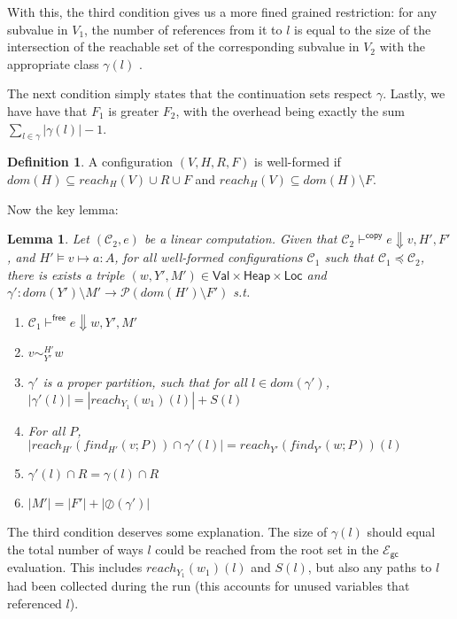 \documentclass{easychair}
\newcommand{\ms}[1]{\ensuremath{\mathsf{#1}}}
\newcommand{\veq}[4]{#3 \sim^{#1}_{#2} #4}
\newcommand{\oh}[1]{\oslash(#1)}
\newcommand{\gcSem}{\ensuremath{\mathcal{E}_{\ms{gc}}}}
\newtheorem{lemma}[theorem]{Lemma}
\theoremstyle{definition}
\newtheorem{definition}{Definition}
\begin{document}
With this, the third condition gives us a more fined grained restriction: for any subvalue in $V_1$,
the number of references from it to $l$ is equal to the size of 
the intersection of the reachable set of the corresponding subvalue in $V_2$
with the appropriate class $\gamma(l)$ .

The next condition simply states that the continuation sets respect $\gamma$. Lastly, 
we have have that $F_1$ is greater $F_2$, with the overhead being exactly the sum 
$\sum_{l \in \gamma} |\gamma(l)| - 1$. 

\begin{definition} A configuration $(V,H,R,F)$ is well-formed if 
	$dom(H) \subseteq reach_H(V) \cup R \cup F$ and $reach_H(V) \subseteq dom(H)\setminus F$.
\end{definition}
Now the key lemma:

\begin{lemma}
	Let $(\mathcal{C}_2,e)$ be a linear computation. Given that 
	$\mathcal{C}_2 \vdash^{\mathsf{copy}} e \Downarrow v,H',F'$, and $H' \vDash v \mapsto a : A$, 
	for all well-formed configurations $\mathcal{C}_1$ such that $\mathcal{C}_1 \preceq \mathcal{C}_2$,
there is exists a triple
$(w,Y',M') \in \ms{Val} \times \ms{Heap} \times \ms{Loc}$ and 
	$\gamma' : dom(Y') \setminus M' \to \mathcal{P}(dom(H') \setminus F')$ s.t.
	\begin{enumerate}
			\item $\mathcal{C}_1 \vdash^{\mathsf{free}} e \Downarrow w,Y',M'$
			\item $\veq{H'}{Y'}{v}{w}$
			\item $\gamma'$ is a proper partition, such that for all $l \in dom(\gamma')$, 
				$|\gamma'(l)| = |reach_{Y_1}(w_1)(l)| + S(l)$
			\item For all $P$, $|reach_{H'}(find_{H'}(v;P)) \cap \gamma'(l)| = 
				reach_{Y'}(find_{Y'}(w;P))(l)$
			\item $\gamma'(l) \cap R = \gamma(l) \cap R$
			\item $|M'| = |F'| + |\oh{\gamma'}|$
	\end{enumerate}
\end{lemma}

The third condition deserves some explanation. The size of $\gamma(l)$ should equal the total number 
of ways $l$ could be reached from the root set in the \gcSem evaluation. This includes 
$reach_{Y_1}(w_1)(l)$ and $S(l)$, but also any paths to $l$ had been collected during the run 
(this accounts for unused variables that referenced $l$).
\end{document}
